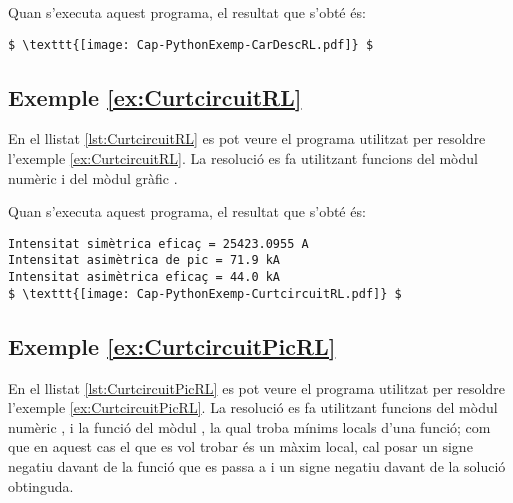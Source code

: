 Quan s'executa aquest programa, el resultat que s'obté és:
\lstset{
	language=,
	numbers=none,
	frame=none
}
\begin{lstlisting}[mathescape=true]
$ \texttt{[image: Cap-PythonExemp-CarDescRL.pdf]} $
\end{lstlisting}


\hypertarget{exemple:CurtcircuitRL}{\subsection{Exemple \ref*{ex:CurtcircuitRL} \CurtcircuitRL}}
En el llistat \vref{lst:CurtcircuitRL} es pot veure el programa utilitzat per resoldre l'exemple \vref{ex:CurtcircuitRL}. La resolució es fa utilitzant funcions del mòdul numèric  i del mòdul gràfic  .


Quan s'executa aquest programa, el resultat que s'obté és:
\lstset{
	language=,
	numbers=none,
	frame=none
}
\begin{lstlisting}[mathescape=true]
Intensitat simètrica eficaç = 25423.0955 A
Intensitat asimètrica de pic = 71.9 kA
Intensitat asimètrica eficaç = 44.0 kA
$ \texttt{[image: Cap-PythonExemp-CurtcircuitRL.pdf]} $
\end{lstlisting}


\hypertarget{exemple:CurtcircuitPicRL}{\subsection{Exemple \ref*{ex:CurtcircuitPicRL} \CurtcircuitPicRL}}
En el llistat \vref{lst:CurtcircuitPicRL} es pot veure el programa utilitzat per resoldre l'exemple \vref{ex:CurtcircuitPicRL}. La resolució es fa utilitzant funcions del mòdul numèric , i la funció  del mòdul  , la qual troba mínims locals d'una funció; com que en aquest cas  el que es vol trobar és un màxim local, cal posar un signe negatiu davant de la funció que es passa a  i un signe negatiu davant de la solució obtinguda.



